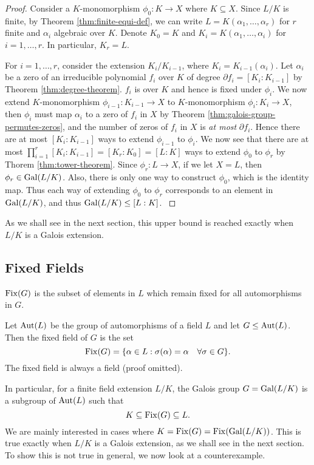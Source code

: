 \begin{proof}
	Consider a $K$-monomorphism $\phi_0 : K \to X$ where $K \subseteq X$. Since $L/K$ is finite, by Theorem \ref{thm:finite-equi-def}, we can write $L = K(\alpha_1, \ldots, \alpha_r)$ for $r$ finite and $\alpha_i$ algebraic over $K$. Denote $K_0 = K$ and
	$K_i = K(\alpha_1, \dots, \alpha_i)$ for $i = 1, \ldots, r$. In particular, $K_r = L$. 
	
	
	For $i = 1, \ldots, r$, consider the extension $K_i / K_{i-1}$, where $K_i = K_{i-1} (\alpha_i)$. Let $\alpha_i$ be a zero of an irreducible polynomial $f_i$ over $K$ of degree $\partial f_i = [K_i : K_{i-1}]$ by Theorem \ref{thm:degree-theorem}. $f_i$ is over $K$ and hence is fixed under $\phi_i$. We now extend $K$-monomorphism $\phi_{i-1} : K_{i-1} \to X$ to $K$-monomorphism $\phi_i: K_i \to X$, then $\phi_i$ must map $\alpha_i$ to a zero of $f_i$ in $X$ by Theorem \ref{thm:galois-group-permutes-zeros}, and the number of zeros of $f_i$ in $X$ is \textit{at most} $\partial f_i$. Hence there are at most $[K_i : K_{i-1}]$ ways to extend $\phi_{i-1}$ to $\phi_i$. We now see that there are at most $\prod_{i=1} ^r [K_i : K_{i-1}] = [K_r : K_0] = [L : K]$ ways to extend $\phi_0$ to $\phi_r$ by Thorem \ref{thm:tower-theorem}. Since $\phi_r : L \to X$, if we let $X = L$, then $\phi_r \in \operatorname{Gal}(L/K)$. Also, there is only one way to construct $\phi_0$, which is the identity map. Thus each way of extending $\phi_0$ to $\phi_r$ corresponds to an element in $\operatorname{Gal}(L/K)$, and thus $\operatorname{Gal}(L/K) \le [L:K]$.  \cite{galois-theory-lectures}
\end{proof}

As we shall see in the next section, this upper bound is reached exactly when $L/K$ is a Galois extension. 


\subsection{Fixed Fields}
 $\operatorname{Fix}(G)$ is the subset of elements in $L$ which remain fixed for all automorphisms in $G$.
\begin{definition}
    Let $\operatorname{Aut}(L)$ be the group of automorphisms of a field $L$ and let $G \leq \operatorname{Aut}(L)$. Then the fixed field of $G$ is the set $$\operatorname{Fix}(G) = \{ \alpha \in L : \sigma(\alpha) = \alpha \quad \forall \sigma \in G \}. $$ The fixed field is always a field (proof omitted).
\end{definition}

In particular, for a finite field extension $L/ K$, the Galois group $G = \operatorname{Gal}(L / K)$ is a subgroup of $\operatorname{Aut}(L)$ such that $$K \subseteq \operatorname{Fix}(G) \subseteq L. $$ We are mainly interested in cases where $K = \operatorname{Fix}(G) = \operatorname{Fix}(\operatorname{Gal}(L/K))$. This is true exactly when $L/K$ is a Galois extension, as we shall see in the next section. To show this is not true in general, we now look at a counterexample. 

